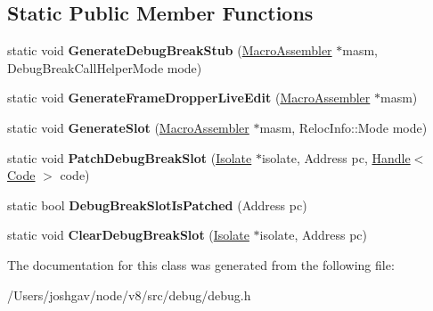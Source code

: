 \subsection*{Static Public Member Functions}
\begin{DoxyCompactItemize}
\item 
static void {\bfseries Generate\+Debug\+Break\+Stub} (\hyperlink{classv8_1_1internal_1_1_macro_assembler}{Macro\+Assembler} $\ast$masm, Debug\+Break\+Call\+Helper\+Mode mode)\hypertarget{classv8_1_1internal_1_1_debug_codegen_ae99b305d11e8d9e5dff826c9bfc15ff1}{}\label{classv8_1_1internal_1_1_debug_codegen_ae99b305d11e8d9e5dff826c9bfc15ff1}

\item 
static void {\bfseries Generate\+Frame\+Dropper\+Live\+Edit} (\hyperlink{classv8_1_1internal_1_1_macro_assembler}{Macro\+Assembler} $\ast$masm)\hypertarget{classv8_1_1internal_1_1_debug_codegen_ac1cc4eccb6ae5d0a62f953cbee1e4d06}{}\label{classv8_1_1internal_1_1_debug_codegen_ac1cc4eccb6ae5d0a62f953cbee1e4d06}

\item 
static void {\bfseries Generate\+Slot} (\hyperlink{classv8_1_1internal_1_1_macro_assembler}{Macro\+Assembler} $\ast$masm, Reloc\+Info\+::\+Mode mode)\hypertarget{classv8_1_1internal_1_1_debug_codegen_aaf2af4f0ff80918e3cbd489ce0a5f39f}{}\label{classv8_1_1internal_1_1_debug_codegen_aaf2af4f0ff80918e3cbd489ce0a5f39f}

\item 
static void {\bfseries Patch\+Debug\+Break\+Slot} (\hyperlink{classv8_1_1internal_1_1_isolate}{Isolate} $\ast$isolate, Address pc, \hyperlink{classv8_1_1internal_1_1_handle}{Handle}$<$ \hyperlink{classv8_1_1internal_1_1_code}{Code} $>$ code)\hypertarget{classv8_1_1internal_1_1_debug_codegen_ad921b651bab94118d254230fce912db3}{}\label{classv8_1_1internal_1_1_debug_codegen_ad921b651bab94118d254230fce912db3}

\item 
static bool {\bfseries Debug\+Break\+Slot\+Is\+Patched} (Address pc)\hypertarget{classv8_1_1internal_1_1_debug_codegen_a5ab6a6d567feb336587138a779525e5e}{}\label{classv8_1_1internal_1_1_debug_codegen_a5ab6a6d567feb336587138a779525e5e}

\item 
static void {\bfseries Clear\+Debug\+Break\+Slot} (\hyperlink{classv8_1_1internal_1_1_isolate}{Isolate} $\ast$isolate, Address pc)\hypertarget{classv8_1_1internal_1_1_debug_codegen_a695a9b09b04ae24fa3718e5d7bb9bc78}{}\label{classv8_1_1internal_1_1_debug_codegen_a695a9b09b04ae24fa3718e5d7bb9bc78}

\end{DoxyCompactItemize}


The documentation for this class was generated from the following file\+:\begin{DoxyCompactItemize}
\item 
/\+Users/joshgav/node/v8/src/debug/debug.\+h\end{DoxyCompactItemize}
